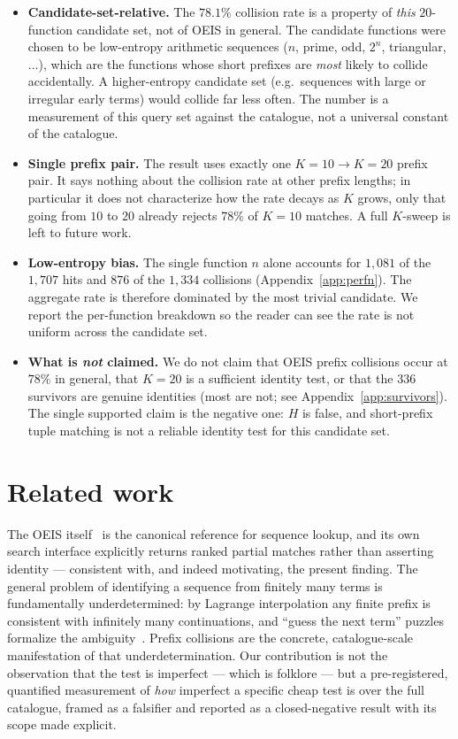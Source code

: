 \documentclass[11pt,a4paper]{article}
\newcommand{\Kten}{K\!=\!10}
\newcommand{\Ktwenty}{K\!=\!20}
\theoremstyle{definition}
\begin{document}
\begin{itemize}
  \item \textbf{Candidate-set-relative.} The $78.1\%$ collision rate is a
  property of \emph{this} $20$-function candidate set, not of OEIS in general.
  The candidate functions were chosen to be low-entropy arithmetic sequences
  ($n$, prime, odd, $2^n$, triangular, $\dots$), which are the functions whose
  short prefixes are \emph{most} likely to collide accidentally. A
  higher-entropy candidate set (e.g.\ sequences with large or irregular early
  terms) would collide far less often. The number is a measurement of this
  query set against the catalogue, not a universal constant of the catalogue.
  \item \textbf{Single prefix pair.} The result uses exactly one
  $\Kten\!\to\!\Ktwenty$ prefix pair. It says nothing about the collision rate
  at other prefix lengths; in particular it does not characterize how the rate
  decays as $K$ grows, only that going from $10$ to $20$ already rejects $78\%$
  of $\Kten$ matches. A full $K$-sweep is left to future work.
  \item \textbf{Low-entropy bias.} The single function $n$ alone accounts for
  $1{,}081$ of the $1{,}707$ hits and $876$ of the $1{,}334$ collisions
  (Appendix~\ref{app:perfn}). The aggregate rate is therefore dominated by the
  most trivial candidate. We report the per-function breakdown so the reader can
  see the rate is not uniform across the candidate set.
  \item \textbf{What is \emph{not} claimed.} We do not claim that OEIS prefix
  collisions occur at $78\%$ in general, that $K=20$ is a sufficient identity
  test, or that the $336$ survivors are genuine identities (most are not; see
  Appendix~\ref{app:survivors}). The single supported claim is the negative
  one: $H$ is false, and short-prefix tuple matching is not a reliable identity
  test for this candidate set.
\end{itemize}

\section{Related work}
\label{sec:related}

The OEIS itself~\citep{oeis,sloane2003} is the canonical reference for
sequence lookup, and its own search interface explicitly returns ranked partial
matches rather than asserting identity --- consistent with, and indeed
motivating, the present finding. The general problem of identifying a sequence
from finitely many terms is fundamentally underdetermined: by Lagrange
interpolation any finite prefix is consistent with infinitely many continuations,
and ``guess the next term'' puzzles formalize the ambiguity~\citep{guessseq}.
Prefix collisions are the concrete, catalogue-scale manifestation of that
underdetermination. Our contribution is not the observation that the test is
imperfect --- which is folklore --- but a pre-registered, quantified measurement
of \emph{how} imperfect a specific cheap test is over the full catalogue, framed
as a falsifier and reported as a closed-negative result with its scope made
explicit.
\end{document}
